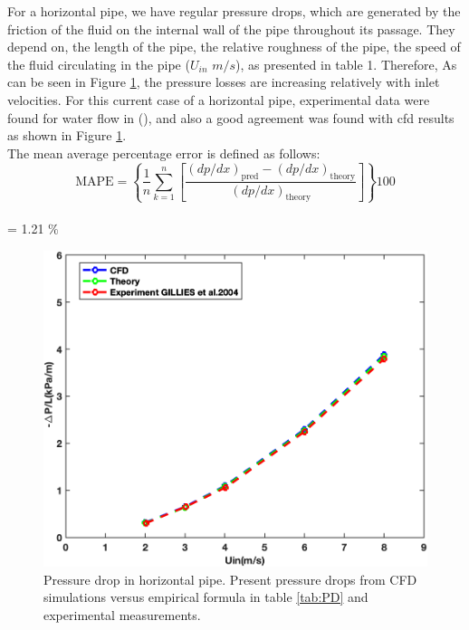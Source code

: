 \documentclass[11pt]{report}
\begin{document}
For a horizontal pipe, we have regular pressure drops, which are generated by the friction of the fluid on the internal wall of the pipe throughout its passage. 
%
They depend on, the length of the pipe, the relative roughness of the pipe, the speed of the fluid circulating in the pipe ($U_{in}$ $m/s$), as presented in table 1. 
%
Therefore, As can be seen in Figure \ref{horiz:theo}, the pressure losses are increasing relatively with inlet velocities. 
%
For this current case of a horizontal pipe, experimental data were found for water flow in (\citet{Randal-2004}), and also a good agreement was found with cfd results as shown in Figure \ref{horiz:theo}.\\
%
The mean average percentage error is defined as follows:
%
\footnotesize{$$
\text{MAPE}=\left\{\frac{1}{n} \sum_{k=1}^{n}\left[\frac{(d p / d x)_{\text{pred}}-(d p / d x)_{\text{theory} }}{(d p / d x)_{\text{theory}}}\right]\right\} 100
$$\\
 = 1.21 $\%$}
\begin{figure}[ht!]
\begin{center}
\includegraphics[scale = 0.45]{figs/WH}
\caption{ Pressure drop in horizontal pipe. 
%
Present pressure drops from CFD simulations versus empirical formula in table \ref{tab:PD} and experimental measurements.}\label{horiz:theo}
%
\end{center}
\end{figure}
\end{document}
